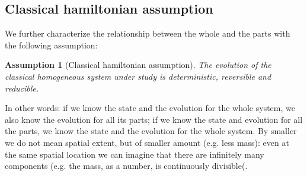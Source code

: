 \documentclass[aps,pra,10pt,twocolumn,floatfix,nofootinbib]{revtex4-1}
\newtheorem{assump}{Assumption}
\theoremstyle{definition}
\begin{document}
\subsection{Classical hamiltonian assumption}




We further characterize the relationship between the whole and the parts with the following assumption:

\begin{assump}[Classical hamiltonian assumption]\label{classical}
The evolution of the classical homogeneous system under study is deterministic, reversible and reducible.
\end{assump}

In other words: if we know the state and the evolution for the whole system, we also know the evolution for all its parts; if we know the state and evolution for all the parts, we know the state and the evolution for the whole system. By smaller we do not mean spatial extent, but of smaller amount (e.g. less mass): even at the same spatial location we can imagine that there are infinitely many components (e.g. the mass, as a number, is continuously divisible(.
\end{document}
